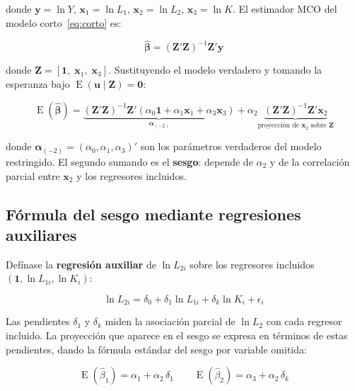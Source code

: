 \documentclass[12pt, letterpaper]{article}
\newcommand{\E}{\operatorname{E}}
\begin{document}
donde $\mathbf{y} = \ln Y$, $\mathbf{x}_1 = \ln L_1$,
$\mathbf{x}_2 = \ln L_2$, $\mathbf{x}_3 = \ln K$. El estimador MCO del
modelo corto~\eqref{eq:corto} es:

\begin{equation}
  \hat{\boldsymbol{\beta}}
  = (\mathbf{Z}'\mathbf{Z})^{-1}\mathbf{Z}'\mathbf{y}
\end{equation}

donde $\mathbf{Z} = [\mathbf{1},\; \mathbf{x}_1,\; \mathbf{x}_3]$.
Sustituyendo el modelo verdadero y tomando la esperanza bajo
$\E(\mathbf{u}\mid\mathbf{Z}) = \mathbf{0}$:

\begin{equation}
  \E(\hat{\boldsymbol{\beta}})
  = \underbrace{(\mathbf{Z}'\mathbf{Z})^{-1}\mathbf{Z}'
    (\alpha_0\mathbf{1} + \alpha_1\mathbf{x}_1
    + \alpha_3\mathbf{x}_3)}_{\boldsymbol{\alpha}_{(-2)}}
  + \alpha_2\underbrace{(\mathbf{Z}'\mathbf{Z})^{-1}\mathbf{Z}'\mathbf{x}_2}%
    _{\text{proyección de } \mathbf{x}_2 \text{ sobre } \mathbf{Z}}
\end{equation}

donde $\boldsymbol{\alpha}_{(-2)} = (\alpha_0, \alpha_1, \alpha_3)'$ son
los parámetros verdaderos del modelo restringido. El segundo sumando es el
\textbf{sesgo}: depende de $\alpha_2$ y de la correlación parcial entre
$\mathbf{x}_2$ y los regresores incluidos.

\subsection{Fórmula del sesgo mediante regresiones auxiliares}

Defínase la \textbf{regresión auxiliar} de $\ln L_{2i}$ sobre los
regresores incluidos $(\mathbf{1}, \ln L_{1i}, \ln K_i)$:

\begin{equation}
  \ln L_{2i} = \delta_0 + \delta_1 \ln L_{1i} + \delta_k \ln K_i + \epsilon_i
\end{equation}

Las pendientes $\delta_1$ y $\delta_k$ miden la asociación parcial de
$\ln L_2$ con cada regresor incluido. La proyección que aparece en el
sesgo se expresa en términos de estas pendientes, dando la fórmula
estándar del sesgo por variable omitida:

\begin{equation}
  \boxed{\E(\hat{\beta}_1) = \alpha_1 + \alpha_2\,\delta_1}
  \qquad
  \boxed{\E(\hat{\beta}_2) = \alpha_3 + \alpha_2\,\delta_k}
\end{equation}
\end{document}
